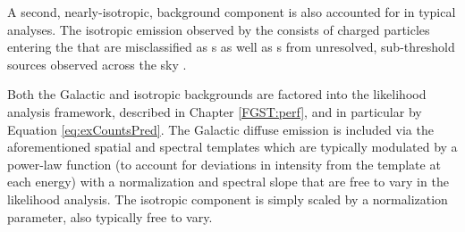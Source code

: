 A second, nearly-isotropic, background component is also accounted for in typical \lat{} analyses. The isotropic emission observed by the \lat{} consists of charged particles entering the \lat{} that are misclassified as \gam{}s as well as \gam{}s from unresolved, sub-threshold sources observed across the sky \citep{isoSpec}.

Both the Galactic and isotropic backgrounds are factored into the likelihood analysis framework, described in Chapter \ref{FGST:perf}, and in particular by Equation \ref{eq:exCountsPred}. The Galactic diffuse emission is included via the aforementioned spatial and spectral templates which are typically modulated by a power-law function (to account for deviations in intensity from the template at each energy) with a normalization and spectral slope that are free to vary in the likelihood analysis. The isotropic component is simply scaled by a normalization parameter, also typically free to vary.



